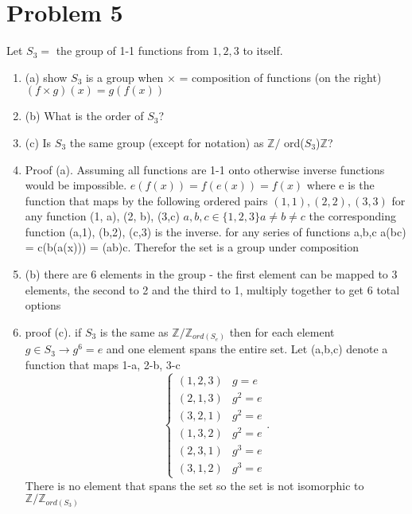 \documentclass{article}
\begin{document}
    \section{Problem 5}
    Let  $S_3 =$ the group of 1-1 functions from $1,2,3$ to itself.
    \begin{enumerate}
        \item (a) show $S_3$ is a group when $\times$ = composition of functions (on the right)
            $(f \times g)(x) = g(f(x))$ 
        \item (b) What is the order of $S_3$?
        \item (c) Is $S_3$ the same group (except for notation) as $ \mathbb{Z} / $ ord($S_3$)$ \mathbb{Z}$?
        \item Proof (a).
            Assuming all functions are 1-1 onto otherwise inverse functions would be impossible.
            $e(f(x)) = f(e(x)) = f(x)$ where e is the function that maps by the following ordered pairs  $(1,1), (2,2), (3,3)$ 
            for any function (1, a), (2, b), (3,c) $a,b,c \in \{1,2,3\} a \ne b \ne c$ the corresponding function (a,1), (b,2), (c,3) is 
            the inverse. for any series of functions a,b,c a(bc) = c(b(a(x))) = (ab)c. Therefor the set is a group under composition
        \item (b)
            there are 6 elements in the group - the first element can be mapped to 3 elements, the second to 2 and the third to 1, multiply together to get 6 total options
        \item proof (c).
            if $S_3$ is the same as $ \mathbb{Z} / \mathbb{Z}_{ord(S_e)}$ then for each element  $g \in S_3 \rightarrow g^{6} = e$
            and one element spans the entire set. Let (a,b,c) denote a function that maps 1-a, 2-b, 3-c
            \[
             \begin{cases}
                (1,2,3) & g=e\\
                (2,1,3) & g^2=e\\
                (3,2,1) & g^2=e\\
                (1,3,2) & g^2=e\\
                (2,3,1) & g^3=e\\
                (3,1,2) & g^3=e
            \end{cases}
            .\] 
            There is no element that spans the set so the set is not isomorphic to $ \mathbb{Z} / \mathbb{Z}_{ord(S_3)}$

    \end{enumerate}
\end{document}
